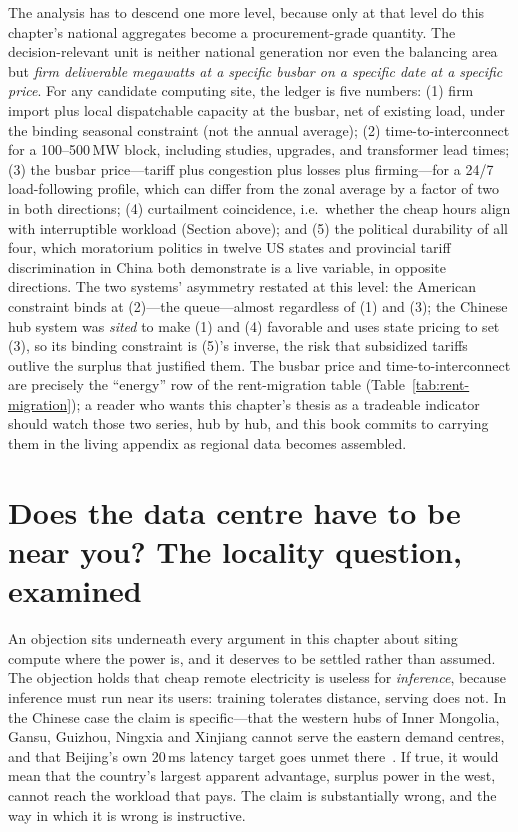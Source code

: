 The analysis has to descend one more level, because only at that level do this chapter's national aggregates become a procurement-grade quantity. The decision-relevant unit is neither national generation nor even the balancing area but \emph{firm deliverable megawatts at a specific busbar on a specific date at a specific price}. For any candidate computing site, the ledger is five numbers: (1) firm import plus local dispatchable capacity at the busbar, net of existing load, under the binding seasonal constraint (not the annual average); (2) time-to-interconnect for a 100--500\,MW block, including studies, upgrades, and transformer lead times; (3) the busbar price---tariff plus congestion plus losses plus firming---for a 24/7 load-following profile, which can differ from the zonal average by a factor of two in both directions; (4) curtailment coincidence, i.e.\ whether the cheap hours align with interruptible workload (Section above); and (5) the political durability of all four, which moratorium politics in twelve US states and provincial tariff discrimination in China both demonstrate is a live variable, in opposite directions. The two systems' asymmetry restated at this level: the American constraint binds at (2)---the queue---almost regardless of (1) and (3); the Chinese hub system was \emph{sited} to make (1) and (4) favorable and uses state pricing to set (3), so its binding constraint is (5)'s inverse, the risk that subsidized tariffs outlive the surplus that justified them. The busbar price and time-to-interconnect are precisely the ``energy'' row of the rent-migration table (Table~\ref{tab:rent-migration}); a reader who wants this chapter's thesis as a tradeable indicator should watch those two series, hub by hub, and this book commits to carrying them in the living appendix as regional data becomes assembled.

\section{Does the data centre have to be near you? The locality question, examined}
\label{sec:latency}

An objection sits underneath every argument in this chapter about siting compute where the power is, and it deserves to be settled rather than assumed. The objection holds that cheap remote electricity is useless for \emph{inference}, because inference must run near its users: training tolerates distance, serving does not. In the Chinese case the claim is specific---that the western hubs of Inner Mongolia, Gansu, Guizhou, Ningxia and Xinjiang cannot serve the eastern demand centres, and that Beijing's own 20\,ms latency target goes unmet there~\cite{china-idle,toms-latency}. If true, it would mean that the country's largest apparent advantage, surplus power in the west, cannot reach the workload that pays. The claim is substantially wrong, and the way in which it is wrong is instructive.

